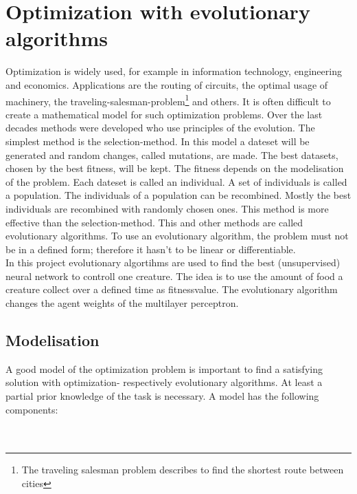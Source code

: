 \documentclass[10pt,a4paper,DIV=11]{scrreprt}
\begin{document}
\chapter{Optimization with evolutionary algorithms}
\label{sec:evo}
Optimization is widely used, for example in information technology, engineering and
economics. Applications are the routing of circuits, the optimal usage of machinery,
the traveling-salesman-problem\footnote{The traveling salesman problem describes to find the shortest route between cities} and others. It is often difficult to create a mathematical
model for such optimization problems. Over the last decades methods were developed who use principles of the evolution.
The simplest method is the selection-method. In this model a dateset will be generated and random changes, called mutations, are made. The best datasets, chosen by the best fitness, will be kept. The fitness depends on the modelisation of the problem.
Each dateset is called an individual. A set of individuals is called a population. The individuals
of a population can be recombined. Mostly the best individuals are recombined with randomly chosen
ones. This method is more effective than the selection-method. This and other methods are  called
evolutionary algorithms. To use an evolutionary algorithm, the problem must not be in a defined form;
therefore it hasn't to be linear or differentiable. \\

In this project evolutionary algortihms are used to find the best 
(unsupervised) neural network to controll one creature. The idea is to use the amount of food a creature collect over a defined time as fitnessvalue. The evolutionary algorithm changes the agent weights of the multilayer perceptron.

\section{Modelisation}
A good model of the optimization problem is important to find a satisfying solution with optimization- respectively evolutionary algorithms. At least a partial prior knowledge of the task is necessary.
A model has the following components: \\

   \\
\\
\end{document}
